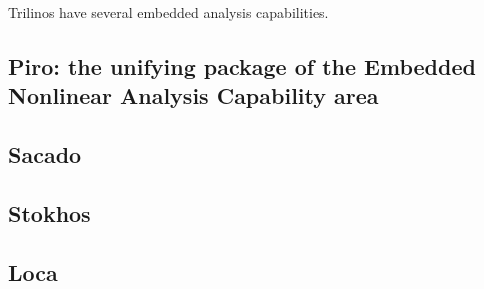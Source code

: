 

Trilinos have several embedded analysis capabilities.

\subsection{Piro: the unifying package of the Embedded Nonlinear Analysis Capability area}

\subsection{Sacado}

\subsection{Stokhos}

\subsection{Loca}

